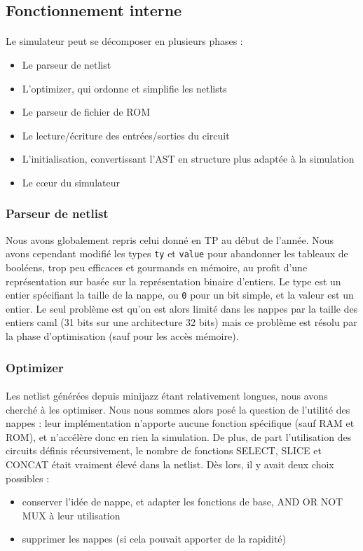 \documentclass{article}
\begin{document}
\subsection{Fonctionnement interne}

\paragraph{}Le simulateur peut se décomposer en plusieurs phases :
\begin{itemize}
	\item Le parseur de netlist
	\item L'optimizer, qui ordonne et simplifie les netlists
	\item Le parseur de fichier de ROM
	\item Le lecture/écriture des entrées/sorties du circuit
	\item L'initialisation, convertissant l'AST en structure plus adaptée à la simulation
	\item Le cœur du simulateur
\end{itemize}

\subsubsection{Parseur de netlist}
Nous avons globalement repris celui donné en TP au début de l'année. Nous avons cependant modifié les types \texttt{ty} et \texttt{value} pour abandonner les tableaux de booléens, trop peu efficaces et gourmands en mémoire, au profit d'une représentation sur basée sur la représentation binaire d'entiers. Le type est un entier spécifiant la taille de la nappe, ou \texttt0 pour un bit simple, et la valeur est un entier. Le seul problème est qu'on est alors limité dans les nappes par la taille des entiers caml (31 bits sur une architecture 32 bits) mais ce problème est résolu par la phase d'optimisation (sauf pour les accès mémoire).

\subsubsection{Optimizer}
\paragraph{}Les netlist générées depuis minijazz étant relativement longues, nous avons cherché à les optimiser. Nous nous sommes alors posé la question de l'utilité des nappes : leur  implémentation n'apporte aucune fonction spécifique (sauf RAM et ROM),  et n'accélère donc en rien la simulation.
De  plus, de part l'utilisation des circuits définis récursivement, le  nombre de fonctions SELECT, SLICE et CONCAT était vraiment élevé dans la netlist.
Dès lors, il y avait deux choix possibles :
\begin{itemize}
	\item conserver l'idée de nappe, et adapter les fonctions de base, AND OR NOT MUX à leur utilisation
	\item supprimer les nappes (si cela pouvait apporter de la rapidité)
\end{itemize}
\end{document}
